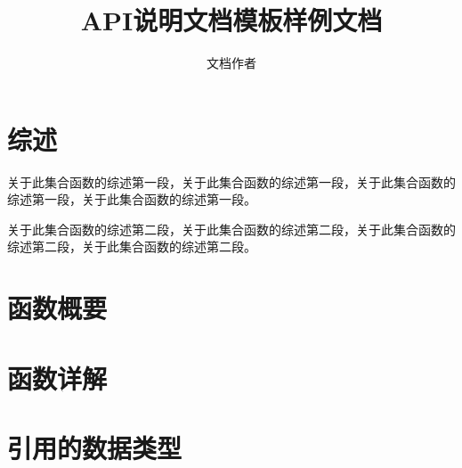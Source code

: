 \documentclass[adobefonts,UTF8,a4paper,fancyhdr,fntef]{ctexart}
\begin{document}
\title{API说明文档模板样例文档}
\author{文档作者}
\maketitle


\section{综述}
关于此集合函数的综述第一段，关于此集合函数的综述第一段，关于此集合函数的综述第一段，关于此集合函数的综述第一段。

关于此集合函数的综述第二段，关于此集合函数的综述第二段，关于此集合函数的综述第二段，关于此集合函数的综述第二段。


\section{函数概要}
\newpage %


\section{函数详解}
\newpage %


\section{引用的数据类型}

\end{document}
